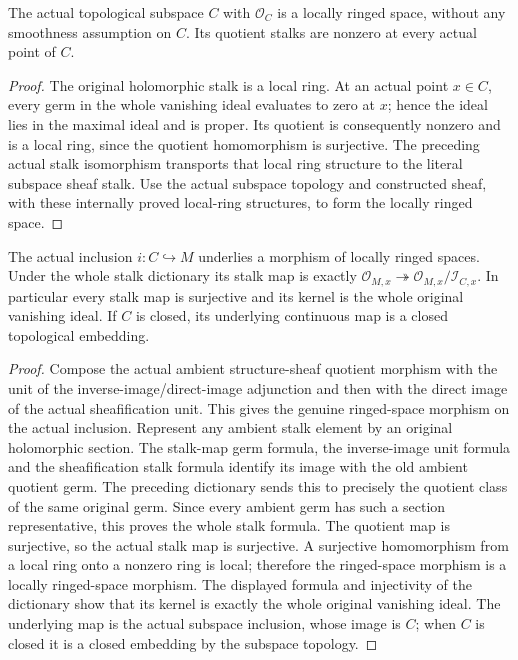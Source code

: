 \begin{theorem}
\label{hir:actual-analytic-subspace-locally-ringed}
\leanok
The actual topological subspace $C$ with $\mathcal O_C$ is a locally ringed
space, without any smoothness assumption on $C$. Its quotient stalks are
nonzero at every actual point of $C$.
\end{theorem}
\begin{proof}
The original holomorphic stalk is a local ring. At an actual point $x\in C$,
every germ in the whole vanishing ideal evaluates to zero at $x$; hence the
ideal lies in the maximal ideal and is proper. Its quotient is consequently
nonzero and is a local ring, since the quotient homomorphism is surjective.
The preceding actual stalk isomorphism transports that local ring structure
to the literal subspace sheaf stalk. Use the actual subspace topology and
constructed sheaf, with these internally proved local-ring structures, to
form the locally ringed space.
\end{proof}

\begin{theorem}
\label{hir:actual-analytic-subspace-inclusion-stalk}
\leanok
The actual inclusion $i:C\hookrightarrow M$ underlies a morphism of locally
ringed spaces. Under the whole stalk dictionary its stalk map is exactly
$\mathcal O_{M,x}\twoheadrightarrow\mathcal O_{M,x}/\mathcal I_{C,x}$.
In particular every stalk map is surjective and its kernel is the whole
original vanishing ideal. If $C$ is closed, its underlying continuous map
is a closed topological embedding.
\end{theorem}
\begin{proof}
Compose the actual ambient structure-sheaf quotient morphism with the
unit of the inverse-image/direct-image adjunction and then with the
direct image of the actual sheafification unit. This gives the genuine
ringed-space morphism on the actual inclusion.
Represent any ambient stalk element by an original holomorphic section.
The stalk-map germ formula, the inverse-image unit formula and the
sheafification stalk formula identify its image with the old ambient
quotient germ. The preceding dictionary sends this to precisely the
quotient class of the same original germ. Since every ambient germ has
such a section representative, this proves the whole stalk formula.
The quotient map is surjective, so the actual stalk map is surjective.
A surjective homomorphism from a local ring onto a nonzero ring is local;
therefore the ringed-space morphism is a locally ringed-space morphism.
The displayed formula and injectivity of the dictionary show that its
kernel is exactly the whole original vanishing ideal. The underlying map
is the actual subspace inclusion, whose image is $C$; when $C$ is closed
it is a closed embedding by the subspace topology.
\end{proof}

